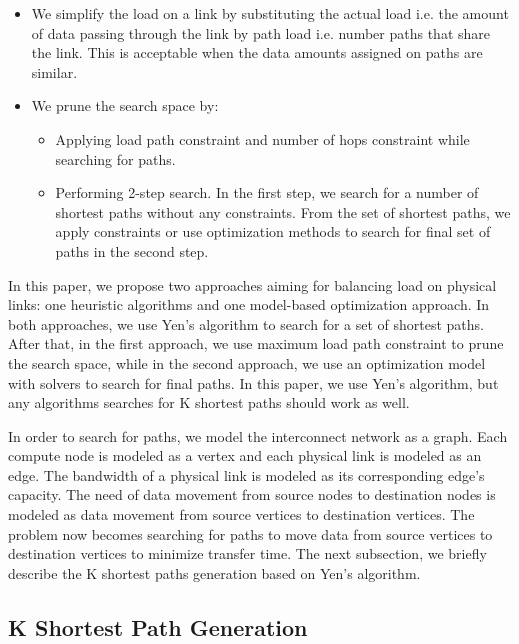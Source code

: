 \begin{itemize}
\item We simplify the load on a link by substituting the actual load i.e. the amount of data passing through the link by path load i.e. number paths that share the link. This is acceptable when the data amounts assigned on paths are similar.
\item We prune the search space by:
\begin{itemize}
\item Applying load path constraint and number of hops constraint while searching for paths.
\item Performing 2-step search. In the first step, we search for a number of shortest paths without any constraints. From the set of shortest paths, we apply constraints or use optimization methods to search for final set of paths in the second step.
\end{itemize}
\end{itemize}

In this paper, we propose two approaches aiming for balancing load on physical links: one heuristic algorithms and one model-based optimization approach. In both approaches, we use Yen's algorithm \cite{Yen:Kpath} to search for a set of shortest paths. After that, in the first approach, we use maximum load path constraint to prune the search space, while in the second approach, we use an optimization model with solvers to search for final paths. In this paper, we use Yen's algorithm, but any algorithms searches for K shortest paths should work as well.

In order to search for paths, we model the interconnect network as a graph. Each compute node is modeled as a vertex and each physical link is modeled as an edge. The bandwidth of a physical link is modeled as its corresponding edge's capacity. The need of data movement from source nodes to destination nodes is modeled as data movement from source vertices to destination vertices. The problem now becomes searching for paths to move data from source vertices to destination vertices to minimize transfer time. The next subsection, we briefly describe the K shortest paths generation based on Yen's algorithm.

\subsection*{K Shortest Path Generation}

